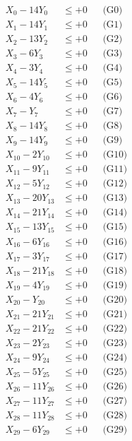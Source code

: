 \documentclass[a4paper,10pt]{article}
\begin{document}
\allowdisplaybreaks
{\small
\begin{align}
X_{0} - 14Y_{0} &\leq +0 && \text{(G0)} \\
X_{1} - 14Y_{1} &\leq +0 && \text{(G1)} \\
\allowbreak
X_{2} - 13Y_{2} &\leq +0 && \text{(G2)} \\
X_{3} - 6Y_{3} &\leq +0 && \text{(G3)} \\
X_{4} - 3Y_{4} &\leq +0 && \text{(G4)} \\
X_{5} - 14Y_{5} &\leq +0 && \text{(G5)} \\
X_{6} - 4Y_{6} &\leq +0 && \text{(G6)} \\
X_{7} - Y_{7} &\leq +0 && \text{(G7)} \\
X_{8} - 14Y_{8} &\leq +0 && \text{(G8)} \\
X_{9} - 14Y_{9} &\leq +0 && \text{(G9)} \\
X_{10} - 2Y_{10} &\leq +0 && \text{(G10)} \\
X_{11} - 9Y_{11} &\leq +0 && \text{(G11)} \\
\allowbreak
X_{12} - 5Y_{12} &\leq +0 && \text{(G12)} \\
X_{13} - 20Y_{13} &\leq +0 && \text{(G13)} \\
X_{14} - 21Y_{14} &\leq +0 && \text{(G14)} \\
X_{15} - 13Y_{15} &\leq +0 && \text{(G15)} \\
X_{16} - 6Y_{16} &\leq +0 && \text{(G16)} \\
X_{17} - 3Y_{17} &\leq +0 && \text{(G17)} \\
X_{18} - 21Y_{18} &\leq +0 && \text{(G18)} \\
X_{19} - 4Y_{19} &\leq +0 && \text{(G19)} \\
X_{20} - Y_{20} &\leq +0 && \text{(G20)} \\
X_{21} - 21Y_{21} &\leq +0 && \text{(G21)} \\
\allowbreak
X_{22} - 21Y_{22} &\leq +0 && \text{(G22)} \\
X_{23} - 2Y_{23} &\leq +0 && \text{(G23)} \\
X_{24} - 9Y_{24} &\leq +0 && \text{(G24)} \\
X_{25} - 5Y_{25} &\leq +0 && \text{(G25)} \\
X_{26} - 11Y_{26} &\leq +0 && \text{(G26)} \\
X_{27} - 11Y_{27} &\leq +0 && \text{(G27)} \\
X_{28} - 11Y_{28} &\leq +0 && \text{(G28)} \\
X_{29} - 6Y_{29} &\leq +0 && \text{(G29)} \\

\end{align}}
\end{document}

